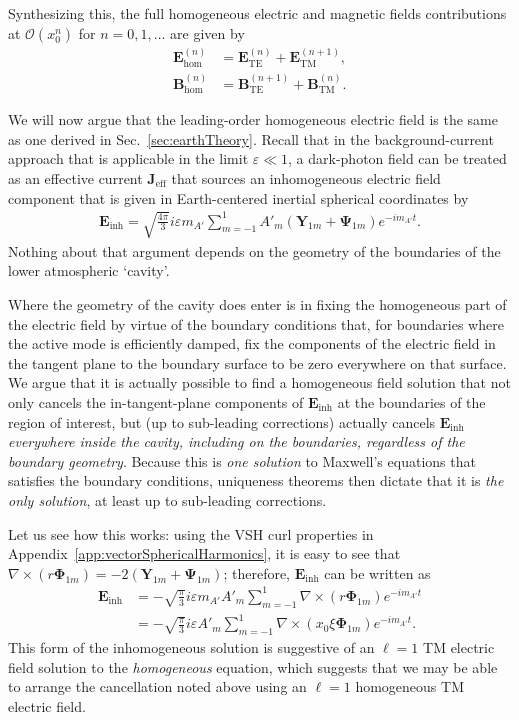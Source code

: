 \documentclass[amsmath,amssymb,aps,10pt,prd,letterpaper,nofootinbib,balancelastpage,notitlepage,superscriptaddress,twocolumn,floatfix]{revtex4-2}
\newcommand{\secref}[2][]{Sec{#1}.~\ref{#2}}		%
\newcommand{\appref}[2][x]{Appendi{#1}~\ref{#2}}	%
\begin{document}
Synthesizing this, the full homogeneous electric and magnetic fields contributions at $\mathcal{O}(x_0^n)$ for $n=0,1,\ldots$ are given by
\begin{align}
    \bm E_\text{hom}^{(n)}&=\bm E_\text{TE}^{(n)}+\bm E_\text{TM}^{(n+1)},\\
    \bm B_\text{hom}^{(n)}&=\bm B_\text{TE}^{(n+1)}+\bm B_\text{TM}^{(n)}.
\end{align}

We will now argue that the leading-order homogeneous electric field is the same as one derived in \secref{sec:earthTheory}.
Recall that in the background-current approach that is applicable in the limit $\varepsilon \ll 1$, a dark-photon field can be treated as an effective current $\bm{J}_{\text{eff}}$ that sources an inhomogeneous electric field component that is given in Earth-centered inertial spherical coordinates by
\begin{align}
    \bm E_\text{inh}=\sqrt{\frac{4\pi}3}i\varepsilon m_{A'}\sum_{m=-1}^1A'_m(\bm Y_{1m}+\bm\Psi_{1m})e^{-im_{A'}t}.
\end{align}
Nothing about that argument depends on the geometry of the boundaries of the lower atmospheric `cavity'.

Where the geometry of the cavity does enter is in fixing the homogeneous part of the electric field by virtue of the boundary conditions that, for boundaries where the active mode is efficiently damped, fix the components of the electric field in the tangent plane to the boundary surface to be zero everywhere on that surface.
We argue that it is actually possible to find a homogeneous field solution that not only cancels the in-tangent-plane components of $\bm E_\text{inh}$ at the boundaries of the region of interest, but (up to sub-leading corrections) actually cancels $\bm E_\text{inh}$ \emph{everywhere inside the cavity, including on the boundaries, regardless of the boundary geometry}. 
Because this is \emph{one solution} to Maxwell's equations that satisfies the boundary conditions, uniqueness theorems then dictate that it is \emph{the only solution}, at least up to sub-leading corrections.

Let us see how this works: using the VSH curl properties in \appref{app:vectorSphericalHarmonics}, it is easy to see that $\nabla\times\left( r \bm\Phi_{1m}\right) = - 2 ( \bm Y_{1m}+\bm\Psi_{1m} )$; therefore, $\bm E_\text{inh}$ can be written as
\begin{align}
    \bm E_\text{inh}&=-\sqrt{\frac\pi3}i\varepsilon m_{A'} A'_m\sum_{m=-1}^1\nabla\times\left( r \bm\Phi_{1m}\right)e^{-im_{A'}t} \\
    &= -\sqrt{\frac\pi3}i\varepsilon A'_m\sum_{m=-1}^1\nabla \times\left( x_0 \xi \bm\Phi_{1m}\right)e^{-im_{A'}t}. \label{eq:imhomogAlt}
\end{align}
This form of the inhomogeneous solution is suggestive of an $\ell = 1$ TM electric field solution to the \emph{homogeneous} equation, which suggests that we may be able to arrange the cancellation noted above using an $\ell = 1$ homogeneous TM electric field.
\end{document}
